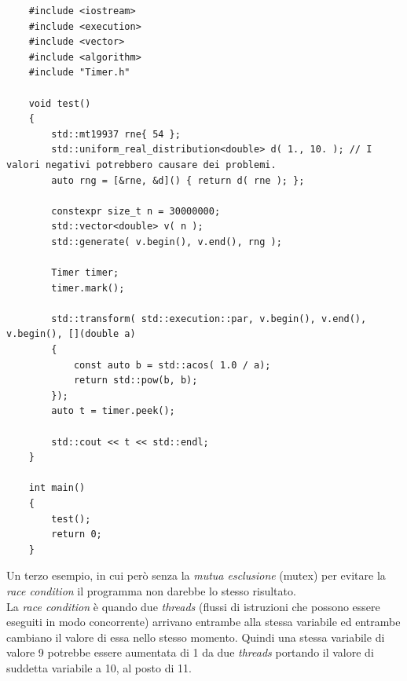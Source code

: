 \begin{lstlisting}
	#include <iostream>
	#include <execution>
	#include <vector>
	#include <algorithm>
	#include "Timer.h"
	
	void test()
	{
		std::mt19937 rne{ 54 };
		std::uniform_real_distribution<double> d( 1., 10. ); // I valori negativi potrebbero causare dei problemi.
		auto rng = [&rne, &d]() { return d( rne ); };
		
		constexpr size_t n = 30000000;
		std::vector<double> v( n );
		std::generate( v.begin(), v.end(), rng );
		
		Timer timer;
		timer.mark();
		
		std::transform( std::execution::par, v.begin(), v.end(), v.begin(), [](double a)
		{
			const auto b = std::acos( 1.0 / a);
			return std::pow(b, b);
		});
		auto t = timer.peek();
		
		std::cout << t << std::endl;
	}
	
	int main()
	{
		test();
		return 0;
	}
\end{lstlisting}

\textsf{\small Un terzo esempio, in cui però senza la \emph{mutua esclusione} (mutex) per evitare la \emph{race condition} il programma non darebbe lo stesso risultato. } \\

\textsf{\small La \emph{race condition} è quando due \emph{threads} (flussi di istruzioni che possono essere eseguiti in modo concorrente) arrivano entrambe alla stessa variabile ed entrambe cambiano il valore di essa nello stesso momento. Quindi una stessa variabile di valore 9 potrebbe essere aumentata di 1 da due \emph{threads} portando il valore di suddetta variabile a 10, al posto di 11.} \\

